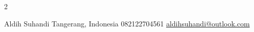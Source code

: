 \documentclass[lighthipster]{simplehipstercv}
\newlength{\rightcolwidth}
\begin{document}
\begin{paracol}{2}
\vfill{} %

\setlength{\parindent}{0pt}
\begin{minipage}[t]{\rightcolwidth}
\begin{center}\fontfamily{\sfdefault}\selectfont \color{black!70}
{\small Aldih Suhandi  Tangerang, Indonesia  082122704561 \newline{} \protect\url{aldihsuhandi@outlook.com}
}
\end{center}
\end{minipage}

\end{paracol}
\end{document}
